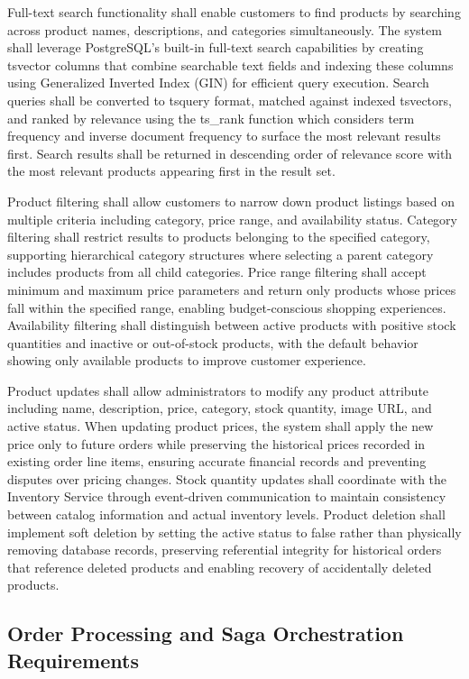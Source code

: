 Full-text search functionality shall enable customers to find products by searching across product names, descriptions, and categories simultaneously. The system shall leverage PostgreSQL's built-in full-text search capabilities by creating tsvector columns that combine searchable text fields and indexing these columns using Generalized Inverted Index (GIN) for efficient query execution. Search queries shall be converted to tsquery format, matched against indexed tsvectors, and ranked by relevance using the ts\_rank function which considers term frequency and inverse document frequency to surface the most relevant results first. Search results shall be returned in descending order of relevance score with the most relevant products appearing first in the result set.

Product filtering shall allow customers to narrow down product listings based on multiple criteria including category, price range, and availability status. Category filtering shall restrict results to products belonging to the specified category, supporting hierarchical category structures where selecting a parent category includes products from all child categories. Price range filtering shall accept minimum and maximum price parameters and return only products whose prices fall within the specified range, enabling budget-conscious shopping experiences. Availability filtering shall distinguish between active products with positive stock quantities and inactive or out-of-stock products, with the default behavior showing only available products to improve customer experience.

Product updates shall allow administrators to modify any product attribute including name, description, price, category, stock quantity, image URL, and active status. When updating product prices, the system shall apply the new price only to future orders while preserving the historical prices recorded in existing order line items, ensuring accurate financial records and preventing disputes over pricing changes. Stock quantity updates shall coordinate with the Inventory Service through event-driven communication to maintain consistency between catalog information and actual inventory levels. Product deletion shall implement soft deletion by setting the active status to false rather than physically removing database records, preserving referential integrity for historical orders that reference deleted products and enabling recovery of accidentally deleted products.

\subsection{Order Processing and Saga Orchestration Requirements}

